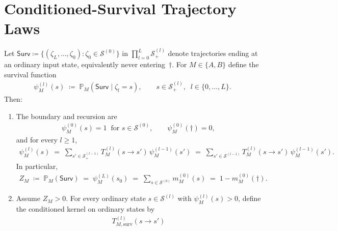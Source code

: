 \section{Conditioned-Survival Trajectory Laws}

\begin{theoremenv}\label{ptnb:thm:conditioned-survival}
Let $\mathsf{Surv} \coloneqq \{(\zeta_L,\ldots,\zeta_0) : \zeta_0 \in \mathcal{S}^{(0)}\}$
in $\prod_{l=0}^{L} \mathcal{S}^{(l)}_+$ denote trajectories ending at an ordinary
input state, equivalently never entering~$\dagger$. For $M\in\{A,B\}$ define the survival function
\begin{align}\label{ptnb:eq:survival-function}
    \psi_M^{(l)}(s)
    \;\coloneqq\;
    \mathbb{P}_M(\mathsf{Surv} \mid \zeta_l = s),
    \qquad s \in \mathcal{S}^{(l)}_+, \;\; l \in \{0,\ldots,L\}.
\end{align}
Then:
\begin{enumerate}
    \item[(i)] The boundary and recursion are
        \begin{align}\label{ptnb:eq:survival-boundary}
            \psi_M^{(0)}(s) = 1 \;\; \text{for } s \in \mathcal{S}^{(0)},
            \qquad
            \psi_M^{(0)}(\dagger) = 0,
        \end{align}
        and for every $l \ge 1$,
        \begin{align}\label{ptnb:eq:survival-recursion}
            \psi_M^{(l)}(s)
            \;=\;
            \sum_{s' \in \mathcal{S}^{(l-1)}_+} T_M^{(l)}(s \to s')\, \psi_M^{(l-1)}(s')
            \;=\;
            \sum_{s' \in \mathcal{S}^{(l-1)}} T_M^{(l)}(s \to s')\, \psi_M^{(l-1)}(s').
        \end{align}
        In particular,
        \begin{align}\label{ptnb:eq:survival-mass}
            Z_M \;\coloneqq\; \mathbb{P}_M(\mathsf{Surv}) \;=\; \psi_M^{(L)}(s_0) \;=\; \sum_{s \in
            \mathcal{S}^{(0)}} m_M^{(0)}(s) \;=\; 1 - m_M^{(0)}(\dagger).
        \end{align}
    \item[(ii)] Assume $Z_M > 0$.  For every ordinary state $s \in \mathcal{S}^{(l)}$ with $\psi_M^{(l)}(s) >
            0$, define the conditioned kernel on ordinary states by
        \begin{align}\label{ptnb:eq:conditioned-kernel}
            T_{M,\mathrm{surv}}^{(l)}(s \to s')

\end{align}
\end{enumerate}
\end{theoremenv}
